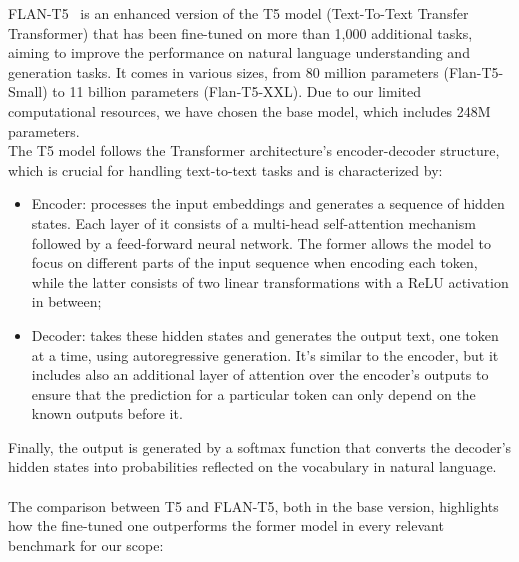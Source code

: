 \documentclass[10pt,twocolumn,letterpaper]{article}
\begin{document}
FLAN-T5~\cite{chung2022scalinginstructionfinetunedlanguagemodels} is an enhanced version of the T5 model (Text-To-Text Transfer Transformer) that has been fine-tuned on more than 1,000 additional tasks, aiming to improve the performance on natural language understanding and generation tasks. It comes in various sizes, from 80 million parameters (Flan-T5-Small) to 11 billion parameters (Flan-T5-XXL). Due to our limited computational resources, we have chosen the base model, which includes 248M parameters.\\
The T5 model follows the Transformer architecture’s encoder-decoder structure, which is crucial for handling text-to-text tasks and is characterized by:
\begin{itemize}
    \item Encoder: processes the input embeddings and generates a sequence of hidden states. Each layer of it consists of a multi-head self-attention mechanism followed by a feed-forward neural network. The former allows the model to focus on different parts of the input sequence when encoding each token, while the latter consists of two linear transformations with a ReLU activation in between;
    \item Decoder: takes these hidden states and generates the output text, one token at a time, using autoregressive generation. It's similar to the encoder, but it includes also an additional layer of attention over the encoder’s outputs to ensure that the prediction for a particular token can only depend on the known outputs before it.
\end{itemize}
Finally, the output is generated by a softmax function that converts the decoder's hidden states into probabilities reflected on the vocabulary in natural language. \\ \\
The comparison between T5 and FLAN-T5, both in the base version, highlights how the fine-tuned one outperforms the former model in every relevant benchmark for our scope: 
\end{document}
